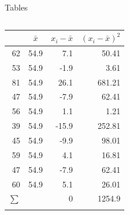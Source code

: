 \documentclass[mathserif, xcolor=svgnames]{beamer}
\begin{document}
\begin{frame}{Tables}
\begin{columns}

\begin{column}{2in}
\singlespacing
\begin{center}  \begin{small}
\begin{tabular}{rrrr} \addlinespace[5pt] \toprule[1.5pt]
\multicolumn{1}{c}{$x_i$} & \multicolumn{1}{c}{$\bar{x}$} &
\multicolumn{1}{r}{$x_i - \bar{x}$} & $(x_i - \bar{x})^2$\\ \midrule
62 & 54.9 & 7.1 & 50.41 \\
53 &  54.9 & -1.9 & 3.61 \\
81&  54.9 & 26.1 & 681.21 \\
47 &  54.9 & -7.9 & 62.41 \\
56 &  54.9 & 1.1 & 1.21 \\
39 &  54.9 & -15.9 & 252.81 \\
45 &  54.9 & -9.9 & 98.01 \\
59 &  54.9 & 4.1 & 16.81 \\
47 &  54.9 & -7.9 & 62.41 \\
60 &  54.9 & 5.1 &  26.01 \\
\midrule
\multicolumn{1}{c}{$\sum$} & & 0 & 1254.9\\
\bottomrule[1.5pt] \addlinespace[5pt]
 \end{tabular} \end{small} \end{center}
\end{column}


\end{columns}
\end{frame}
\end{document}
